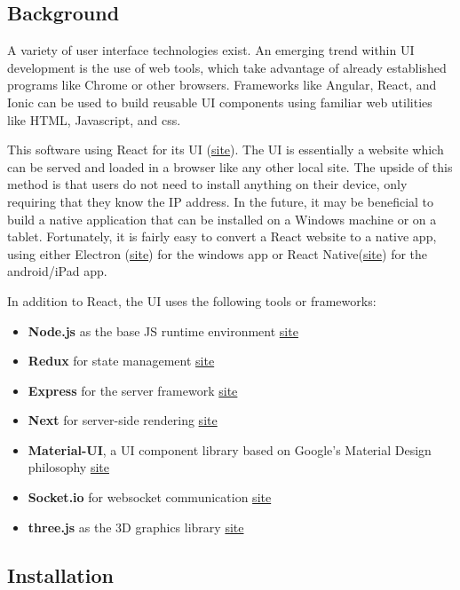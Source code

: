 \documentclass{article}
\begin{document}
	\subsection{Background}
	
	A variety of user interface technologies exist. An emerging trend within UI development is the use of web tools, which take advantage of already established programs like Chrome or other browsers. Frameworks like Angular, React, and Ionic can be used to build reusable UI components using familiar web utilities like HTML, Javascript, and css. 
	
	This software using React for its UI (\href{https://reactjs.org/}{site}). The UI is essentially a website which can be served and loaded in a browser like any other local site. The upside of this method is that users do not need to install anything on their device, only requiring that they know the IP address. In the future, it may be beneficial to build a native application that can be installed on a Windows machine or on a tablet. Fortunately, it is fairly easy to convert a React website to a native app, using either Electron (\href{https://electronjs.org/}{site}) for the windows app or React Native(\href{https://facebook.github.io/react-native/}{site}) for the android/iPad app. 
	
	In addition to React, the UI uses the following tools or frameworks: 
	
	\begin{itemize}
		\item \textbf{Node.js} as the base JS runtime environment \href{https://nodejs.org/en/}{site}
		\item \textbf{Redux} for state management \href{https://redux.js.org/}{site}
		\item \textbf{Express} for the server framework \href{https://expressjs.com/}{site}
		\item \textbf{Next} for server-side rendering \href{https://nextjs.org/}{site}
		\item \textbf{Material-UI}, a UI component library based on Google's Material Design philosophy \href{https://material-ui.com/}{site}
		\item \textbf{Socket.io} for websocket communication \href{https://socket.io/}{site}
		\item \textbf{three.js} as the 3D graphics library \href{https://threejs.org/}{site}
	\end{itemize}
	
	\subsection{Installation}
	
\end{document}
